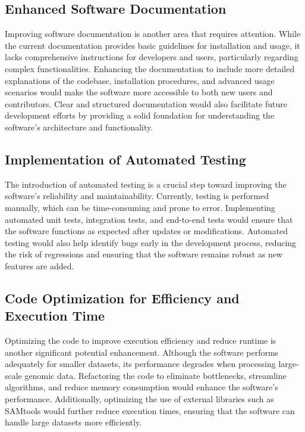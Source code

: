 \subsection{Enhanced Software Documentation}
Improving software documentation is another area that requires attention. While the current documentation provides basic guidelines for installation and usage, it lacks comprehensive instructions for developers and users, particularly regarding complex functionalities. Enhancing the documentation to include more detailed explanations of the codebase, installation procedures, and advanced usage scenarios would make the software more accessible to both new users and contributors. Clear and structured documentation would also facilitate future development efforts by providing a solid foundation for understanding the software's architecture and functionality.

\subsection{Implementation of Automated Testing}
The introduction of automated testing is a crucial step toward improving the software's reliability and maintainability. Currently, testing is performed manually, which can be time-consuming and prone to error. Implementing automated unit tests, integration tests, and end-to-end tests would ensure that the software functions as expected after updates or modifications. Automated testing would also help identify bugs early in the development process, reducing the risk of regressions and ensuring that the software remains robust as new features are added.

\subsection{Code Optimization for Efficiency and Execution Time}
Optimizing the code to improve execution efficiency and reduce runtime is another significant potential enhancement. Although the software performs adequately for smaller datasets, its performance degrades when processing large-scale genomic data. Refactoring the code to eliminate bottlenecks, streamline algorithms, and reduce memory consumption would enhance the software's performance. Additionally, optimizing the use of external libraries such as SAMtools would further reduce execution times, ensuring that the software can handle large datasets more efficiently.

